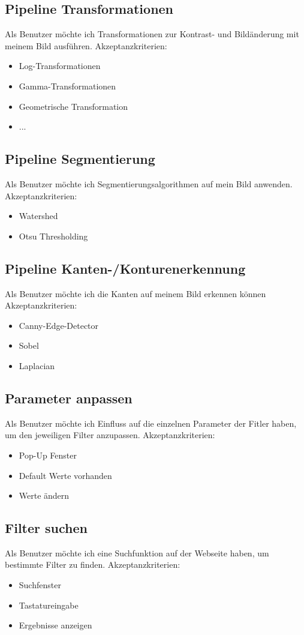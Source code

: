 \documentclass[conference]{IEEEtran}
\begin{document}
\subsection{Pipeline Transformationen}
Als Benutzer möchte ich Transformationen zur Kontrast- und Bildänderung mit meinem Bild ausführen.
Akzeptanzkriterien:
\begin{itemize}
	\item Log-Transformationen
	\item Gamma-Transformationen
	\item Geometrische Transformation
	\item ...
\end{itemize}

\subsection{Pipeline Segmentierung}
Als Benutzer möchte ich Segmentierungsalgorithmen auf mein Bild anwenden.
Akzeptanzkriterien:
\begin{itemize}
	\item Watershed
	\item Otsu Thresholding
\end{itemize}

\subsection{Pipeline Kanten-/Konturenerkennung}
Als Benutzer möchte ich die Kanten auf meinem Bild erkennen können
Akzeptanzkriterien:
\begin{itemize}
	\item Canny-Edge-Detector
	\item Sobel
	\item Laplacian
\end{itemize}

\subsection{Parameter anpassen}
Als Benutzer möchte ich Einfluss auf die einzelnen Parameter der Fitler haben, um den jeweiligen Filter anzupassen.
Akzeptanzkriterien: 
\begin{itemize}
	\item Pop-Up Fenster
	\item Default Werte vorhanden
	\item Werte ändern
\end{itemize}

\subsection{Filter suchen}
Als Benutzer möchte ich eine Suchfunktion auf der Webseite haben, um bestimmte Filter zu finden. 
Akzeptanzkriterien: 
\begin{itemize}
	\item Suchfenster
	\item Tastatureingabe
	\item Ergebnisse anzeigen
\end{itemize}
\end{document}
